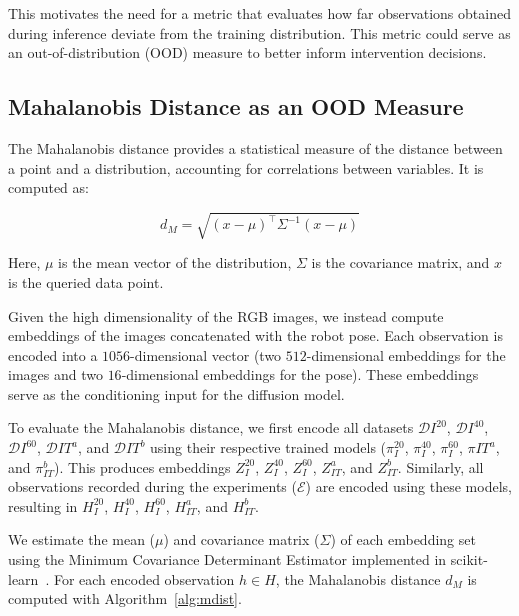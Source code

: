This motivates the need for a metric that evaluates how far observations obtained during inference deviate from the training distribution. This metric could serve as an out-of-distribution (OOD) measure to better inform intervention decisions.

\subsection{Mahalanobis Distance as an OOD Measure}

The Mahalanobis distance provides a statistical measure of the distance between a point and a distribution, accounting for correlations between variables. It is computed as:

\begin{equation} d_M = \sqrt{(x - \mu)^\top \Sigma^{-1} (x - \mu)} \end{equation}

Here, $\mu$ is the mean vector of the distribution, $\Sigma$ is the covariance matrix, and $x$ is the queried data point.

Given the high dimensionality of the RGB images, we instead compute embeddings of the images concatenated with the robot pose. Each observation is encoded into a $1056$-dimensional vector (two $512$-dimensional embeddings for the images and two $16$-dimensional embeddings for the pose). These embeddings serve as the conditioning input for the diffusion model.

To evaluate the Mahalanobis distance, we first encode all datasets $\mathcal{D}I^{20}$, $\mathcal{D}I^{40}$, $\mathcal{D}I^{60}$, $\mathcal{D}{IT}^a$, and $\mathcal{D}{IT}^b$ using their respective trained models ($\pi_I^{20}$, $\pi_I^{40}$, $\pi_I^{60}$, $\pi{IT}^a$, and $\pi_{IT}^b$). This produces embeddings $Z_I^{20}$, $Z_I^{40}$, $Z_I^{60}$, $Z_{IT}^a$, and $Z_{IT}^b$. Similarly, all observations recorded during the experiments ($\mathcal{E}$) are encoded using these models, resulting in $H_I^{20}$, $H_I^{40}$, $H_I^{60}$, $H_{IT}^a$, and $H_{IT}^b$.

We estimate the mean ($\mu$) and covariance matrix ($\Sigma$) of each embedding set using the Minimum Covariance Determinant Estimator implemented in scikit-learn~\cite{scikit-learn}. For each encoded observation $h \in H$, the Mahalanobis distance $d_M$ is computed with Algorithm~\ref{alg:mdist}.


